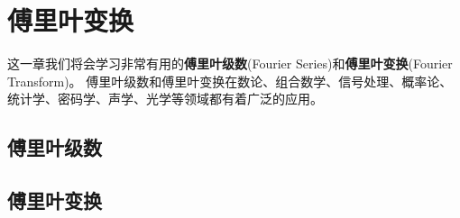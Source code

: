 \chapter{傅里叶变换}
这一章我们将会学习非常有用的\textbf{傅里叶级数}(Fourier Series)和\textbf{傅里叶变换}(Fourier Transform)。
傅里叶级数和傅里叶变换在数论、组合数学、信号处理、概率论、统计学、密码学、声学、光学等领域都有着广泛的应用。


\section{傅里叶级数}
\label{sec:fourier_series}

\section{傅里叶变换}
\label{sec:fourier_transform}



